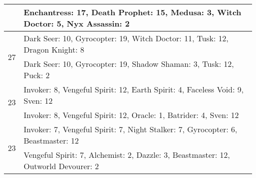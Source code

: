 \begin{table}[H]
\begin{tabular}{ | c | p{12.5cm} | }
    & Enchantress: 17, Death Prophet: 15, Medusa: 3, Witch Doctor: 5, Nyx Assassin: 2 \\
    \hline
    \multirow{2}{*}{27}
    & Dark Seer: 10, Gyrocopter: 19, Witch Doctor: 11, Tusk: 12, Dragon Knight: 8 \\
    & Dark Seer: 10, Gyrocopter: 19, Shadow Shaman: 3, Tusk: 12, Puck: 2 \\
    \hline
    \multirow{2}{*}{23}
    & Invoker: 8, Vengeful Spirit: 12, Earth Spirit: 4, Faceless Void: 9, Sven: 12 \\
    & Invoker: 8, Vengeful Spirit: 12, Oracle: 1, Batrider: 4, Sven: 12 \\
    \hline
    \multirow{2}{*}{23}
    & Invoker: 7, Vengeful Spirit: 7, Night Stalker: 7, Gyrocopter: 6, Beastmaster: 12 \\
    & Vengeful Spirit: 7, Alchemist: 2, Dazzle: 3, Beastmaster: 12, Outworld Devourer: 2 \\
    \hline
  \end{tabular}
  \caption{}
  \label{}
\end{table}


